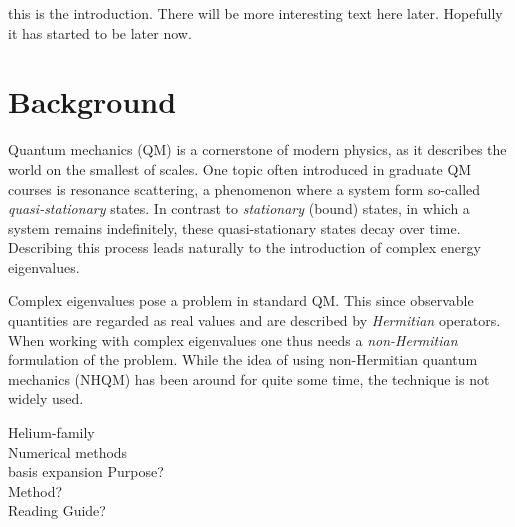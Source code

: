 
this is the introduction. There will be more interesting text here later. Hopefully it has started to be later now.

\section{Background}
Quantum mechanics (QM) is a cornerstone of modern physics, as it describes the world on the smallest of scales.
One topic often introduced in graduate QM courses is resonance scattering, a phenomenon where a system form so-called \emph{quasi-stationary} states.
In contrast to \emph{stationary} (bound) states, in which a system remains indefinitely, these quasi-stationary states decay over time.
Describing this process leads naturally to the introduction of complex energy eigenvalues. 

Complex eigenvalues pose a problem in standard QM.
This since observable quantities are regarded as real values and are described by \emph{Hermitian} operators.
When working with complex eigenvalues one thus needs a \emph{non-Hermitian} formulation of the problem.
While the idea of using non-Hermitian quantum mechanics (NHQM) has been around for quite some time, the technique is not widely used.


{\Large Helium-family \\ Numerical methods\\ basis expansion}
{\Large Purpose? \\ Method? \\ Reading Guide?}

